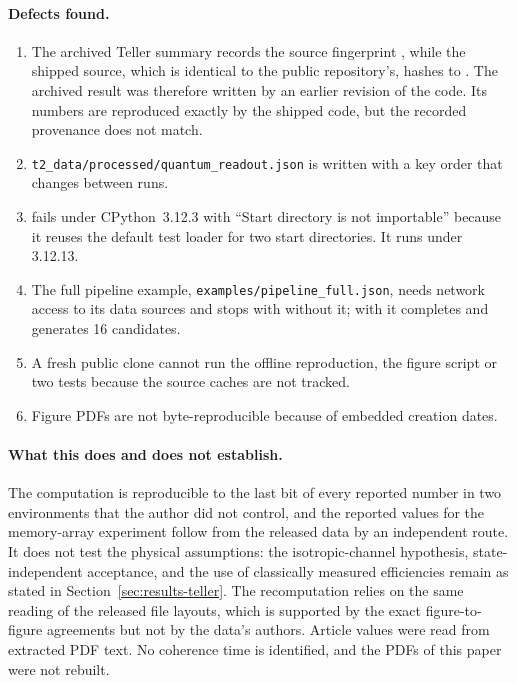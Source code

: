 \paragraph{Defects found.}
\begin{enumerate}[leftmargin=*,itemsep=1pt]
\item The archived Teller summary records the source fingerprint , while the shipped source, which is identical to the public repository's, hashes to . The archived result was therefore written by an earlier revision of the code. Its numbers are reproduced exactly by the shipped code, but the recorded provenance does not match.
\item \nolinkurl{t2_data/processed/quantum_readout.json} is written with a key order that changes between runs.
\item {} fails under CPython~3.12.3 with ``Start directory is not importable'' because it reuses the default test loader for two start directories. It runs under 3.12.13.
\item The full pipeline example, \nolinkurl{examples/pipeline_full.json}, needs network access to its data sources and stops with  without it; with  it completes and generates 16 candidates.
\item A fresh public clone cannot run the offline reproduction, the figure script or two tests because the source caches are not tracked.
\item Figure PDFs are not byte-reproducible because of embedded creation dates.
\end{enumerate}

\paragraph{What this does and does not establish.}
The computation is reproducible to the last bit of every reported number in two environments that the author did not control, and the reported values for the memory-array experiment follow from the released data by an independent route. It does not test the physical assumptions: the isotropic-channel hypothesis, state-independent acceptance, and the use of classically measured efficiencies remain as stated in Section~\ref{sec:results-teller}. The recomputation relies on the same reading of the released file layouts, which is supported by the exact figure-to-figure agreements but not by the data's authors. Article values were read from extracted PDF text. No coherence time is identified, and the PDFs of this paper were not rebuilt.
